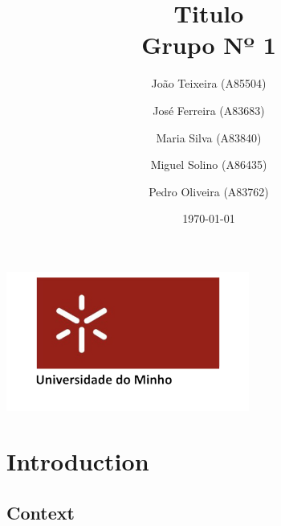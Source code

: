 \documentclass[a4paper]{report}
\begin{document}
\title{Titulo\\
\large Grupo Nº 1}

\author{João Teixeira (A85504) \and José Ferreira (A83683) \and Maria Silva (A83840) \and Miguel Solino (A86435) \and Pedro Oliveira (A83762)}


\date{\today}

\begin{center}
    \begin{minipage}{0.75\linewidth}
        \centering
       
        \includegraphics[width=0.6\textwidth]{uminho.png}\par\vspace{1cm}
        \vspace{1cm}
        \href{https://www.uminho.pt/PT}
        {\color{black}{\scshape\LARGE Universidade do Minho}} \par
        \vspace{1cm}
        \href{https://www.di.uminho.pt/}
        {\color{black}{\scshape\Large Departamento de Informática}} \par
        \maketitle
    \end{minipage}
\end{center}

\tableofcontents

\pagebreak

	\chapter{Introduction}
	    
        \section{Context}
        
\end{document}
